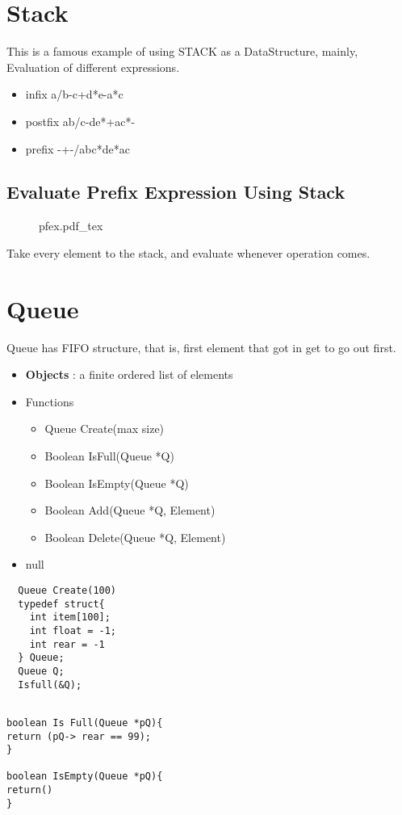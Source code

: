 \documentclass[9pt]{article}
\begin{document}
\section{Stack}

\maketitle
This is a famous example of using STACK as a DataStructure, mainly, Evaluation of different expressions.

\begin{itemize}
  \item infix
  a/b-c+d*e-a*c
  \item postfix
  ab/c-de*+ac*-
  \item prefix
  -+-/abc*de*ac
\end{itemize}

\subsection{Evaluate Prefix Expression Using Stack}

\begin{figure}[H]
	\centering
	\def\svgwidth{\columnwidth}
	{pfex.pdf_tex}

	\label{fig:pfex}
\end{figure}

Take every element to the stack, and evaluate whenever operation comes.

\section{Queue}

Queue has FIFO structure, that is, first element that got in get to go out first.
\begin{itemize}
    \item \textbf{Objects} : a finite ordered list of elements
    \item Functions
  \begin{itemize}
    \item Queue Create(max size)
    \item Boolean IsFull(Queue *Q)
    \item Boolean IsEmpty(Queue *Q)
    \item Boolean Add(Queue *Q, Element)
    \item Boolean Delete(Queue *Q, Element)
  \end{itemize}
  \item null
\end{itemize}

\begin{verbatim}
  Queue Create(100)
  typedef struct{
    int item[100];
    int float = -1;
    int rear = -1
  } Queue;
  Queue Q;
  Isfull(&Q);
\end{verbatim}

\begin{verbatim}

boolean Is Full(Queue *pQ){
return (pQ-> rear == 99);
}

boolean IsEmpty(Queue *pQ){
return()
}
\end{verbatim}
\end{document}
